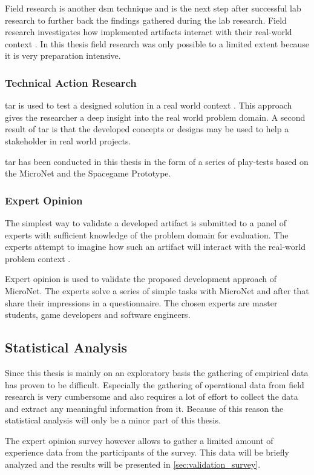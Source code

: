 Field research is another \gls{dsm} technique and is the next step after
successful lab research to further back the findings gathered during the lab
research. Field research investigates how implemented artifacts interact with
their real-world context \cite{wieringa2014design_science}. In this thesis field
research was only possible to a limited extent because it is very preparation
intensive.

\subsubsection{Technical Action Research}

\gls{tar} is used to test a designed solution in a real world context
\cite{wieringa2014design_science}. This approach gives the researcher a deep
insight into the real world problem domain. A second result of \gls{tar} is that
the developed concepts or designs may be used to help a stakeholder in real
world projects.

\gls{tar} has been conducted in this thesis in the form of a series of
play-tests based on the MicroNet and the Spacegame Prototype.

\subsubsection{Expert Opinion}

The simplest way to validate a developed artifact is submitted to a panel of
experts with sufficient knowledge of the problem domain for evaluation. The
experts attempt to imagine how such an artifact will interact with the
real-world problem context \cite{wieringa2014design_science}. 

Expert opinion is used to validate the proposed development approach of
MicroNet. The experts solve a series of simple tasks with MicroNet and after
that share their impressions in a questionnaire. The chosen experts are master
students, game developers and software engineers.

\subsection{Statistical Analysis}

Since this thesis is mainly on an exploratory basis the gathering of empirical
data has proven to be difficult. Especially the gathering of operational data from
field research is very cumbersome and also requires a lot of effort to collect
the data and extract any meaningful information from it. Because of this
reason the statistical analysis will only be a minor part of this thesis.

The expert opinion survey however allows to gather a limited amount of
experience data from the participants of the survey. This data will be briefly
analyzed and the results will be presented in \autoref{sec:validation_survey}.






